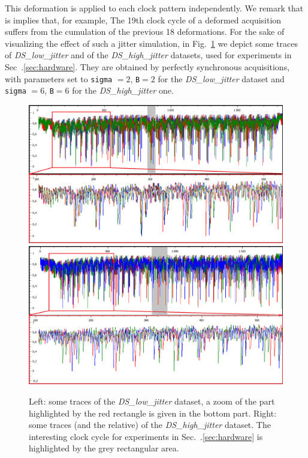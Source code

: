 This deformation is applied to each clock pattern independently. We remark that is implies that, for example, The 19th clock cycle of a deformed acquisition suffers from the cumulation of the previous 18 deformations. For the sake of visualizing the effect of such a jitter simulation, in Fig.~\ref{fig:jitter_traces} we depict some traces of  \emph{DS\_low\_jitter} and of the \emph{DS\_high\_jitter} datasets, used for experiments in Sec~.\ref{sec:hardware}. They are obtained by perfectly synchronous acquisitions, with parameters set to \texttt{sigma} $= 2$, \texttt{B}$= 2$ for the \emph{DS\_low\_jitter}  dataset and \texttt{sigma} $= 6$, \texttt{B}$= 6$ for the \emph{DS\_high\_jitter} one.

\begin{figure}
\includegraphics[width=.5\textwidth]{../Figures/CHES2017/jitter_2_2_framed.png} 
\includegraphics[width=.5\textwidth]{../Figures/CHES2017/jitter_6_6_framed.png} 
\caption[]{Left: some traces of the \emph{DS\_low\_jitter} dataset, a zoom of the part highlighted by the red rectangle is given in the bottom part. Right: some traces (and the relative) of the \emph{DS\_high\_jitter} dataset. The interesting clock cycle for experiments in Sec.~.\ref{sec:hardware} is highlighted by the grey rectangular area.}\label{fig:jitter_traces}
\end{figure}


